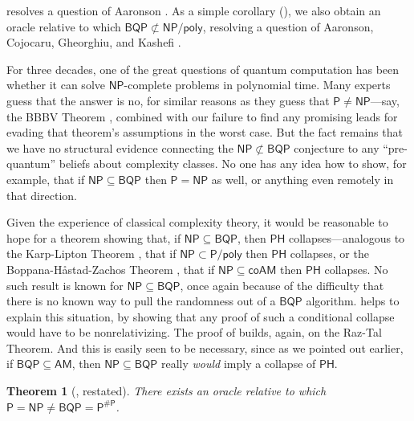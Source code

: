 \documentclass[10pt,a4paper]{article}
\newtheorem{theorem}{Theorem}
\begin{document}
 resolves a question of Aaronson \cite{Aar10}.
As a simple corollary (), we also obtain an oracle relative to which $\mathsf{BQP} \not\subset \mathsf{NP/poly}$, resolving a question of Aaronson, Cojocaru, Gheorghiu, and Kashefi \cite{ACGK19}.

For three decades, one of the great questions of quantum computation has been whether it can solve $\mathsf{NP}$-complete problems in polynomial time. Many experts guess that the answer is no, for similar reasons as they guess that $\mathsf{P} \neq \mathsf{NP}$---say, the BBBV Theorem \cite{BBBV97}, combined with our failure to find any promising leads for evading that theorem's assumptions in the worst case.  But the fact remains that we have no structural evidence connecting the $\mathsf{NP} \not\subset \mathsf{BQP}$ conjecture to any ``pre-quantum'' beliefs about complexity classes.  No one has any idea how to show, for example, that if $\mathsf{NP} \subseteq \mathsf{BQP}$ then $\mathsf{P} = \mathsf{NP}$ as well, or anything even remotely in that direction.

Given the experience of classical complexity theory, it would be
reasonable to hope for a theorem showing that, if $\mathsf{NP} \subseteq \mathsf{BQP}$, then $\mathsf{PH}$ collapses---analogous to the Karp-Lipton Theorem \cite{KL80}, that if $\mathsf{NP} \subset \mathsf{P/poly}$ then $\mathsf{PH}$ collapses, or the Boppana-H\r{a}stad-Zachos Theorem \cite{BHZ87}, that if $\mathsf{NP} \subseteq \mathsf{coAM}$ then $\mathsf{PH}$ collapses.  No such result is known for $\mathsf{NP} \subseteq \mathsf{BQP}$, once again because of the difficulty that there is no known way to pull the randomness out of a $\mathsf{BQP}$ algorithm.   helps to explain this situation, by showing that any proof of such a conditional collapse would have to be nonrelativizing.  The proof of  builds, again, on the Raz-Tal Theorem.  And this is easily seen to be necessary, since as we pointed out earlier, if $\mathsf{BQP} \subseteq \mathsf{AM}$, then $\mathsf{NP} \subseteq \mathsf{BQP}$ really \textit{would} imply a collapse of $\mathsf{PH}$.

\begin{theorem}[, restated]
\label{thm:p=np_bqp=pp_intro}
There exists an oracle relative to which $\mathsf{P} = \mathsf{NP} \neq \mathsf{BQP} = \mathsf{P^{\# P}}$.
\end{theorem}
\end{document}
